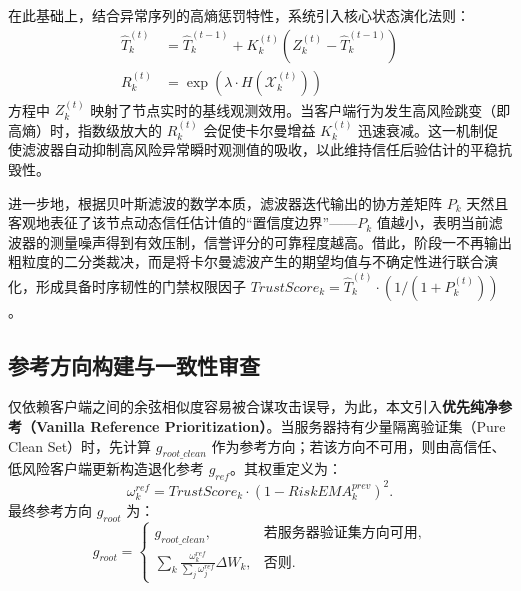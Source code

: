\documentclass[11pt, a4paper, UTF8, fontset=fandol]{ctexart}
\begin{document}
在此基础上，结合异常序列的高熵惩罚特性，系统引入核心状态演化法则：
\begin{align}
    \hat{T}_k^{(t)} & = \hat{T}_k^{(t-1)} + K_k^{(t)} (Z_k^{(t)} - \hat{T}_k^{(t-1)}) \\
    R_k^{(t)}       & = \exp(\lambda \cdot H(\mathcal{X}_k^{(t)}))
\end{align}
方程中 $Z_k^{(t)}$ 映射了节点实时的基线观测效用。当客户端行为发生高风险跳变（即高熵）时，指数级放大的 $R_k^{(t)}$ 会促使卡尔曼增益 $K_k^{(t)}$ 迅速衰减。这一机制促使滤波器自动抑制高风险异常瞬时观测值的吸收，以此维持信任后验估计的平稳抗毁性。

进一步地，根据贝叶斯滤波的数学本质，滤波器迭代输出的协方差矩阵 $P_k$ 天然且客观地表征了该节点动态信任估计值的“置信度边界”——$P_k$ 值越小，表明当前滤波器的测量噪声得到有效压制，信誉评分的可靠程度越高。借此，阶段一不再输出粗粒度的二分类裁决，而是将卡尔曼滤波产生的期望均值与不确定性进行联合演化，形成具备时序韧性的门禁权限因子 $TrustScore_k = \hat{T}_k^{(t)} \cdot (1 / (1 + P_k^{(t)}))$。

\subsection{参考方向构建与一致性审查}
仅依赖客户端之间的余弦相似度容易被合谋攻击误导，为此，本文引入\textbf{优先纯净参考（Vanilla Reference Prioritization）}。当服务器持有少量隔离验证集（Pure Clean Set）时，先计算 $g_{root\_clean}$ 作为参考方向；若该方向不可用，则由高信任、低风险客户端更新构造退化参考 $g_{ref}$。其权重定义为：
\begin{equation}
    \omega_{k}^{ref} = TrustScore_{k} \cdot (1 - RiskEMA_{k}^{prev})^{2}.
\end{equation}
最终参考方向 $g_{root}$ 为：
\begin{equation}
    g_{root}=
    \begin{cases}
        g_{root\_clean},                                                      & \text{若服务器验证集方向可用}, \\
        \sum_{k} \frac{\omega_{k}^{ref}}{\sum_j \omega_{j}^{ref}} \Delta W_k, & \text{否则}.
    \end{cases}
\end{equation}
\end{document}
